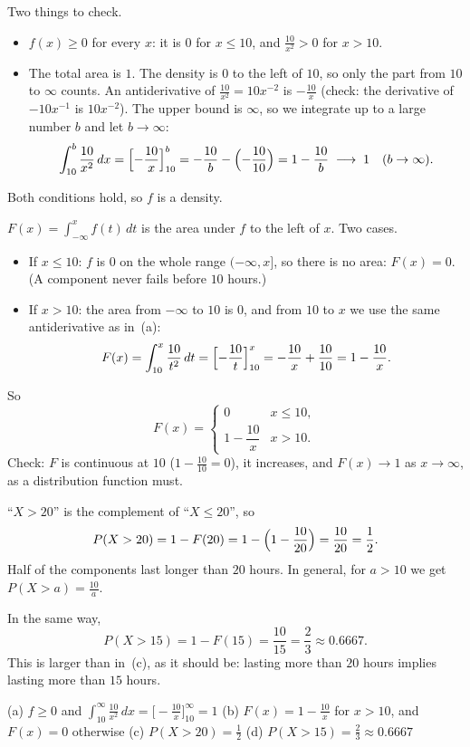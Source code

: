 \begin{solution}
	 Two things to check.
	\begin{itemize}
		\item $f(x)\ge0$ for every $x$: it is $0$ for $x\le10$, and
		      $\frac{10}{x^2}>0$ for $x>10$.
		\item The total area is $1$. The density is $0$ to the left of $10$,
		      so only the part from $10$ to $\infty$ counts. An antiderivative
		      of $\frac{10}{x^2}=10x^{-2}$ is $-\frac{10}{x}$
		      (check: the derivative of $-10x^{-1}$ is $10x^{-2}$). The upper
		      bound is $\infty$, so we integrate up to a large number $b$ and
		      let $b\to\infty$:
		      \[
			      \int_{10}^{b}\frac{10}{x^2}\,dx
			      =\Bigl[-\frac{10}{x}\Bigr]_{10}^{b}
			      =-\frac{10}{b}-\Bigl(-\frac{10}{10}\Bigr)
			      =1-\frac{10}{b}
			      \;\longrightarrow\; 1 \quad (b\to\infty).
		      \]
	\end{itemize}
	Both conditions hold, so $f$ is a density.

	 $F(x)=\int_{-\infty}^{x}f(t)\,dt$ is the area under $f$ to the
	left of $x$. Two cases.
	\begin{itemize}
		\item If $x\le10$: $f$ is $0$ on the whole range $(-\infty,x]$, so
		      there is no area: $F(x)=0$. (A component never fails before
		      $10$ hours.)
		\item If $x>10$: the area from $-\infty$ to $10$ is $0$, and from $10$
		      to $x$ we use the same antiderivative as in~(a):
		      \[
			      F(x)=\int_{10}^{x}\frac{10}{t^2}\,dt
			      =\Bigl[-\frac{10}{t}\Bigr]_{10}^{x}
			      =-\frac{10}{x}+\frac{10}{10}
			      =1-\frac{10}{x}.
		      \]
	\end{itemize}
	So
	\[
		F(x)=\begin{cases}
			0                  & x\le 10, \\[4pt]
			1-\dfrac{10}{x}    & x>10.
		\end{cases}
	\]
	Check: $F$ is continuous at $10$ ($1-\frac{10}{10}=0$), it increases, and
	$F(x)\to1$ as $x\to\infty$, as a distribution function must.

	 ``$X>20$'' is the complement of ``$X\le20$'', so
	\[
		P(X>20)=1-F(20)=1-\Bigl(1-\frac{10}{20}\Bigr)=\frac{10}{20}=\frac12.
	\]
	Half of the components last longer than $20$ hours. In general, for
	$a>10$ we get $P(X>a)=\frac{10}{a}$.

	 In the same way,
	\[
		P(X>15)=1-F(15)=\frac{10}{15}=\frac23\approx0.6667.
	\]
	This is larger than in~(c), as it should be: lasting more than $20$
	hours implies lasting more than $15$ hours.

	\begin{answer}
		(a) $f\ge0$ and $\int_{10}^{\infty}\frac{10}{x^2}\,dx
			=\bigl[-\frac{10}{x}\bigr]_{10}^{\infty}=1$ \newline
		(b) $F(x)=1-\frac{10}{x}$ for $x>10$, and $F(x)=0$ otherwise \newline
		(c) $P(X>20)=\frac12$ \quad
		(d) $P(X>15)=\frac23\approx0.6667$
	\end{answer}
\end{solution}
